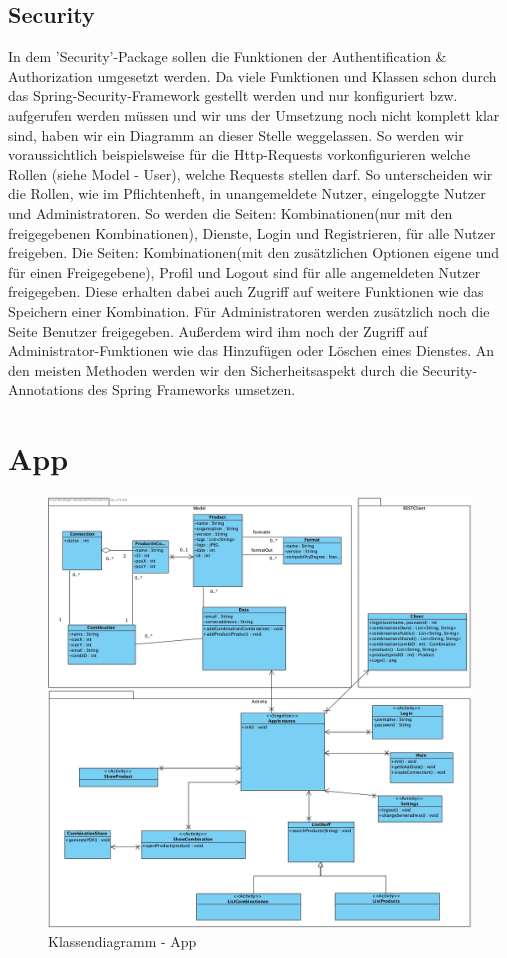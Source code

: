 \FloatBarrier
\subsection{Security}
In dem 'Security'-Package sollen die Funktionen der Authentification \& Authorization umgesetzt werden. Da viele Funktionen und Klassen schon durch das Spring-Security-Framework gestellt werden und nur konfiguriert bzw. aufgerufen werden müssen und wir uns der Umsetzung noch nicht komplett klar sind, haben wir ein Diagramm an dieser Stelle weggelassen.
So werden wir voraussichtlich beispielsweise für die Http-Requests vorkonfigurieren welche Rollen (siehe Model - User), welche Requests stellen darf.
So unterscheiden wir die Rollen, wie im Pflichtenheft, in unangemeldete Nutzer, eingeloggte Nutzer und Administratoren.
So werden die Seiten: Kombinationen(nur mit den freigegebenen Kombinationen), Dienste, Login und Registrieren, für alle Nutzer freigeben.
Die Seiten: Kombinationen(mit den zusätzlichen Optionen eigene und für einen Freigegebene), Profil und Logout sind für alle angemeldeten Nutzer freigegeben.
Diese erhalten dabei auch Zugriff auf weitere Funktionen wie das Speichern einer Kombination.
Für Administratoren werden zusätzlich noch die Seite Benutzer freigegeben.
Außerdem wird ihm noch der Zugriff auf Administrator-Funktionen wie das Hinzufügen oder Löschen eines Dienstes.
An den meisten Methoden werden wir den Sicherheitsaspekt durch die Security-Annotations des Spring Frameworks umsetzen.


\newpage
\section{App}
\begin{figure}[h]
	\centering
	\includegraphics[width=\textwidth]{klassendiagramm/App}
	\caption{Klassendiagramm - App}
	\label{fig:klassendiagramm-app}
\end{figure}

